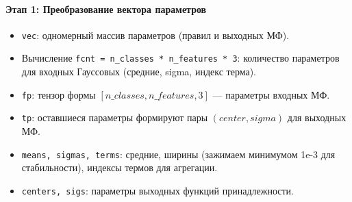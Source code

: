 \paragraph{Этап 1: Преобразование вектора параметров}
\begin{itemize}
  \item \texttt{vec}: одномерный массив параметров (правил и выходных МФ).
  \item Вычисление \texttt{fcnt = n\_classes * n\_features * 3}: количество параметров для входных Гауссовых (средние, sigma, индекс терма).
  \item \texttt{fp}: тензор формы \([n\_classes, n\_features, 3]\) — параметры входных МФ.
  \item \texttt{tp}: оставшиеся параметры формируют пары \((center, sigma)\) для выходных МФ.
  \item \texttt{means, sigmas, terms}: средние, ширины (зажимаем минимумом 1e-3 для стабильности), индексы термов для агрегации.
  \item \texttt{centers, sigs}: параметры выходных функций принадлежности.
\end{itemize}

